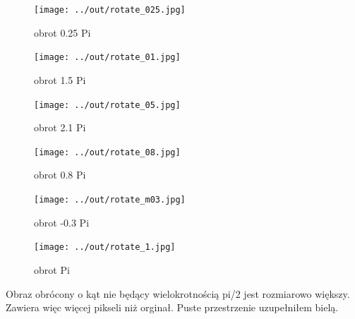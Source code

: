 \documentclass[a4paper,12pt]{article}
\begin{document}
\newpage



\newpage
\begin{figure}[h!]
\begin{minipage}[t]{5cm}
\begin{center}
\texttt{[image: ../out/rotate\_025.jpg]}
\caption{obrot 0.25 Pi}
\end{center}
\end{minipage}
\hfill
\begin{minipage}[t]{5cm}
\begin{center}
\texttt{[image: ../out/rotate\_01.jpg]}
\caption{obrot 1.5 Pi}
\end{center}
\end{minipage}
\hfill
\begin{minipage}[t]{5cm}
\begin{center}
\texttt{[image: ../out/rotate\_05.jpg]}
\caption{obrot 2.1 Pi }
\end{center}
\end{minipage}
\end{figure}

\begin{figure}[h!]
\begin{minipage}[t]{5cm}
\begin{center}
\texttt{[image: ../out/rotate\_08.jpg]}
\caption{obrot 0.8 Pi}
\end{center}
\end{minipage}
\hfill
\begin{minipage}[t]{5cm}
\begin{center}
\texttt{[image: ../out/rotate\_m03.jpg]}
\caption{obrot -0.3 Pi}
\end{center}
\end{minipage}
\hfill
\begin{minipage}[t]{5cm}
\begin{center}
\texttt{[image: ../out/rotate\_1.jpg]}
\caption{obrot Pi}
\end{center}
\end{minipage}
\end{figure}

Obraz obrócony o kąt nie będący wielokrotnością pi/2 jest rozmiarowo większy. Zawiera więc więcej pikseli niż orginał. Puste przestrzenie uzupełniłem bielą.
\end{document}
